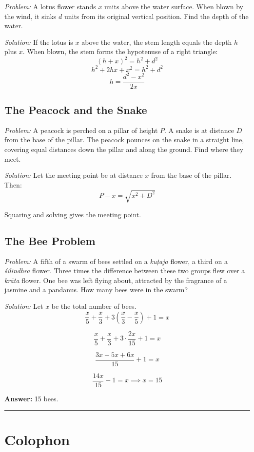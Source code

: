 \documentclass[11pt,a4paper]{book}
\newcommand{\longline}{\noindent\rule{\textwidth}{0.4pt}}
\begin{document}
\textit{Problem:} A lotus flower stands $x$ units above the water surface. When blown by the wind, it sinks $d$ units from its original vertical position. Find the depth of the water.

\textit{Solution:} If the lotus is $x$ above the water, the stem length equals the depth $h$ plus $x$. When blown, the stem forms the hypotenuse of a right triangle:
\[
(h + x)^2 = h^2 + d^2
\]
\[
h^2 + 2hx + x^2 = h^2 + d^2
\]
\[
h = \frac{d^2 - x^2}{2x}
\]

\section*{The Peacock and the Snake}

\textit{Problem:} A peacock is perched on a pillar of height $P$. A snake is at distance $D$ from the base of the pillar. The peacock pounces on the snake in a straight line, covering equal distances down the pillar and along the ground. Find where they meet.

\textit{Solution:} Let the meeting point be at distance $x$ from the base of the pillar. Then:
\[
P - x = \sqrt{x^2 + D^2}
\]

Squaring and solving gives the meeting point.

\section*{The Bee Problem}

\textit{Problem:} A fifth of a swarm of bees settled on a \textit{kuṭaja} flower, a third on a \textit{śilīndhra} flower. Three times the difference between these two groups flew over a \textit{krāta} flower. One bee was left flying about, attracted by the fragrance of a jasmine and a pandanus. How many bees were in the swarm?

\textit{Solution:} Let $x$ be the total number of bees.
\[
\frac{x}{5} + \frac{x}{3} + 3\left(\frac{x}{3} - \frac{x}{5}\right) + 1 = x
\]

\[
\frac{x}{5} + \frac{x}{3} + 3 \cdot \frac{2x}{15} + 1 = x
\]

\[
\frac{3x + 5x + 6x}{15} + 1 = x
\]

\[
\frac{14x}{15} + 1 = x \implies x = 15
\]

\textbf{Answer:} 15 bees.

\longline

\backmatter
\chapter*{Colophon}
\end{document}
